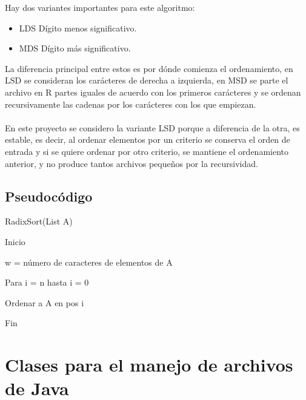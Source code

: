 \documentclass[11pt]{article}
\begin{document}
Hay dos variantes importantes para este algoritmo:
\begin{itemize}
\item{LDS}
Dígito menos significativo. 
\item{MDS}
Dígito más significativo.
\end{itemize} 

La diferencia principal entre estos es por dónde comienza el ordenamiento, en LSD se consideran los carácteres de derecha a izquierda, en MSD se parte el archivo en R partes iguales de acuerdo con los primeros carácteres y se ordenan recursivamente las cadenas por los carácteres con los que empiezan. 

\paragraph{}
En este proyecto se considero la variante LSD porque a diferencia de la otra, es estable, es decir, al ordenar elementos por un criterio se conserva el orden de entrada y si se quiere ordenar por otro criterio, se mantiene el ordenamiento anterior, y no produce tantos archivos pequeños por la recursividad. 

\subsection{Pseudocódigo}
\begin{description}
\item RadixSort(List A)
\item \quad Inicio
\item
\quad 	w =  número de caracteres de elementos de A
\item
\quad Para i = n hasta i = 0
\item
\quad\quad Ordenar a A en pos i
\item
\quad Fin
\end{description}

\paragraph{}


\section{Clases para el manejo de archivos de Java}
\end{document}
